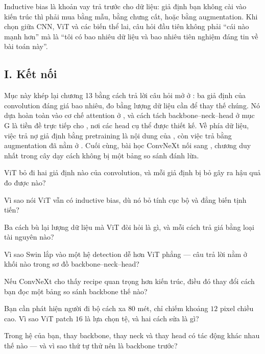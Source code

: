 \documentclass[../../../deep_learning.tex]{subfiles}
\begin{document}
\begin{cannho}
Inductive bias là khoản vay trả trước cho dữ liệu: giả định bạn không cài vào kiến trúc thì phải mua bằng mẫu, bằng chưng cất, hoặc bằng augmentation. Khi chọn giữa CNN, ViT và các biến thể lai, câu hỏi đầu tiên không phải ``cái nào mạnh hơn'' mà là ``tôi có bao nhiêu dữ liệu và bao nhiêu tiên nghiệm đáng tin về bài toán này''. 
\end{cannho}

\subsection{I. Kết nối}
Mục này khép lại chương 13 bằng cách trả lời câu hỏi mở ở : ba giả định của convolution đáng giá bao nhiêu, đo bằng lượng dữ liệu cần để thay thế chúng. Nó dựa hoàn toàn vào cơ chế attention ở , và cách tách backbone--neck--head ở mục G là tiền đề trực tiếp cho , nơi các head cụ thể được thiết kế. Về phía dữ liệu, việc trả nợ giả định bằng pretraining là nội dung của , còn việc trả bằng augmentation đã nằm ở . Cuối cùng, bài học ConvNeXt nối sang , chương duy nhất trong cây dạy cách không bị một bảng so sánh đánh lừa.

\begin{tukiem}
\item ViT bỏ đi hai giả định nào của convolution, và mỗi giả định bị bỏ gây ra hậu quả đo được nào?
\item Vì sao nói ViT vẫn có inductive bias, dù nó bỏ tính cục bộ và đẳng biến tịnh tiến?
\item Ba cách bù lại lượng dữ liệu mà ViT đòi hỏi là gì, và mỗi cách trả giá bằng loại tài nguyên nào?
\item Vì sao Swin lắp vào một hệ detection dễ hơn ViT phẳng --- câu trả lời nằm ở khối nào trong sơ đồ backbone--neck--head?
\item Nếu ConvNeXt cho thấy recipe quan trọng hơn kiến trúc, điều đó thay đổi cách bạn đọc một bảng so sánh backbone thế nào?
\item Bạn cần phát hiện người đi bộ cách xa \(80\) mét, chỉ chiếm khoảng \(12\) pixel chiều cao. Vì sao ViT patch \(16\) là lựa chọn tệ, và hai cách sửa là gì?
\item Trong hệ của bạn, thay backbone, thay neck và thay head có tác động khác nhau thế nào --- và vì sao thứ tự thử nên là backbone trước?
\end{tukiem}
\ifSubfilesClassLoaded{\printbibliography[title={Nguồn}]}{}
\end{document}
